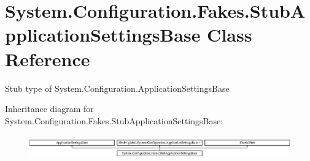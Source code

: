 \hypertarget{class_system_1_1_configuration_1_1_fakes_1_1_stub_application_settings_base}{\section{System.\-Configuration.\-Fakes.\-Stub\-Application\-Settings\-Base Class Reference}
\label{class_system_1_1_configuration_1_1_fakes_1_1_stub_application_settings_base}
}


Stub type of System.\-Configuration.\-Application\-Settings\-Base 


Inheritance diagram for System.\-Configuration.\-Fakes.\-Stub\-Application\-Settings\-Base\-:\begin{figure}[H]
\begin{center}
\leavevmode
\includegraphics[height=1.011743cm]{class_system_1_1_configuration_1_1_fakes_1_1_stub_application_settings_base}
\end{center}
\end{figure}
